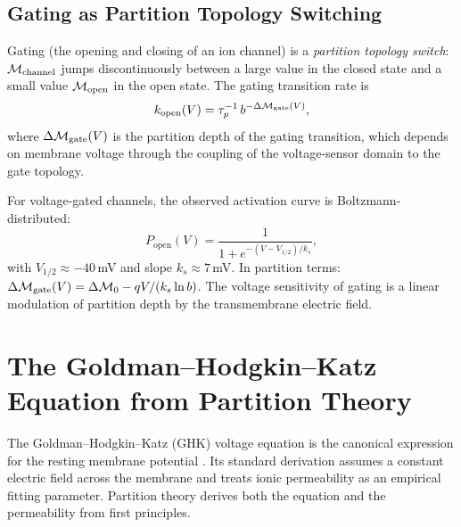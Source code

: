 \subsection{Gating as Partition Topology Switching}
\label{ssec:gating}

Gating (the opening and closing of an ion channel) is a
\emph{partition topology switch}: $\mathcal{M}_{\mathrm{channel}}$ jumps
discontinuously between a large value in the closed state and a small value
$\mathcal{M}_{\mathrm{open}}$ in the open state. The gating transition rate is
\begin{equation}
  k_{\mathrm{open}}(V) = \tau_p^{-1}\,b^{-\Delta\mathcal{M}_{\mathrm{gate}}(V)},
  \label{eq:gating_rate}
\end{equation}
where $\Delta\mathcal{M}_{\mathrm{gate}}(V)$ is the partition depth of the gating
transition, which depends on membrane voltage through the coupling of the
voltage-sensor domain to the gate topology.

For voltage-gated  channels, the observed activation curve is
Boltzmann-distributed:
\begin{equation}
  P_{\mathrm{open}}(V) = \frac{1}{1 + e^{-(V - V_{1/2})/k_s}},
  \label{eq:boltzmann_gate}
\end{equation}
with $V_{1/2} \approx -40$\,mV and slope $k_s \approx 7$\,mV.
In partition terms:
$\Delta\mathcal{M}_{\mathrm{gate}}(V) = \Delta\mathcal{M}_0 - qV/(k_s \ln b)$.
The voltage sensitivity of gating is a linear modulation of partition depth
by the transmembrane electric field.

\section{The Goldman--Hodgkin--Katz Equation from Partition Theory}
\label{sec:ghk}

The Goldman--Hodgkin--Katz (GHK) voltage equation is the canonical expression
for the resting membrane potential \citep{Goldman1943,Hodgkin1952}. Its
standard derivation assumes a constant electric field across the membrane and
treats ionic permeability as an empirical fitting parameter. Partition theory
derives both the equation and the permeability from first principles.


